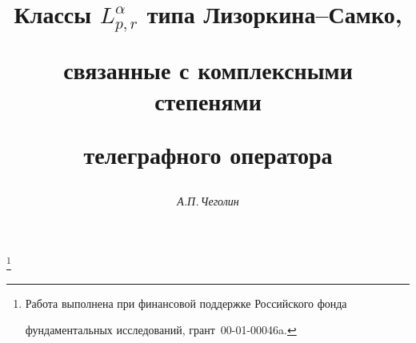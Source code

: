 









\newcommand{\Intr}{\int\limits_{R^n}}


\newcommand{\Ints}{\int\limits_{S_{n-1}}}


\newcommand{\F}{{\cal F}}


\newcommand{\C}{{\bold C}}


\newcommand{\la}{\langle}


\newcommand{\ra}{\rangle}


\newcommand{\myfont}{\series{m}\shape{n}\selectfont }


\newcommand{\R}{\operatorname{Re}}


\newcommand{\im}{\operatorname{Im}}


\newcommand{\tts}[1]{}







\setcounter{page}{58}















\author{\it А.П.\,Чеголин}




\title{Классы $L_{p,r}^\alpha$ типа Лизоркина--Самко, 


связанные с комплексными степенями


телеграфного оператора}


\thanks{Работа выполнена при финансовой поддержке Российского фонда


фундаментальных исследований, грант \No\,00-01-00046a.}





